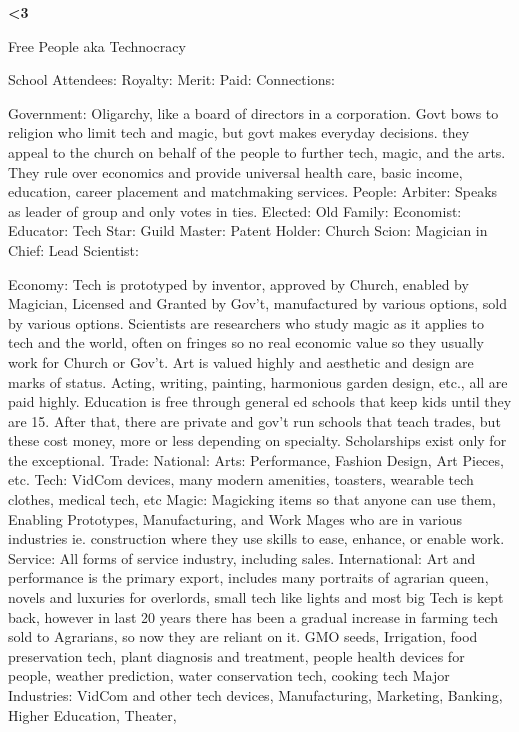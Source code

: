 \documentclass[blue]{GL2020}
\begin{document}
\name{\bTest{}}
\bf{<3}

Free People aka Technocracy

School Attendees:
	Royalty:
	Merit:
	Paid:
	Connections:

Government:  Oligarchy, like a board of directors in a corporation.  Govt bows to religion who limit tech and magic, but govt makes everyday decisions.  they appeal to the church on behalf of the people to further tech, magic, and the arts.  They rule over economics and provide universal health care, basic income, education, career placement and matchmaking services.
	People:		Arbiter:	Speaks as leader of group and only votes in ties.
						Elected:	
						Old Family:
						Economist:
						Educator:
						Tech Star:
						Guild Master:
						Patent Holder:
						Church Scion:
						Magician in Chief:
						Lead Scientist:
	
Economy:		Tech is prototyped by inventor, approved by Church, enabled by Magician, Licensed and Granted 
						by Gov't, manufactured by various options, sold by various options.  Scientists are researchers 
						who study magic as it applies to tech and the world, often on fringes so no real economic value 
						so they usually work for Church or Gov't.
						Art is valued highly and aesthetic and design are marks of status.  Acting, writing, painting,
						harmonious garden design, etc., all are paid highly.
						Education is free through general ed schools that keep kids until they are 15.  After that, there
						are private and gov't run schools that teach trades, but these cost money, more or less depending 
						on specialty.  Scholarships exist only for the exceptional.
	Trade:		National:		Arts:		Performance, Fashion Design, Art Pieces, etc.
												Tech:		VidCom devices, many modern amenities, toasters, wearable tech clothes, 
												medical tech, etc
												Magic:		Magicking items so that anyone can use them, Enabling Prototypes,
												Manufacturing, and Work Mages who are in various industries ie. construction 
												where they use skills to ease, enhance, or enable work.
												Service:		All forms of service industry, including sales.
						International:		Art and performance is the primary export, includes many portraits of agrarian queen, novels and luxuries for overlords, small tech like lights and most big Tech is kept back, however in last 20 years there has been a gradual increase in farming tech sold to Agrarians, so now they are reliant on it.  GMO seeds, Irrigation, food preservation tech, plant diagnosis and treatment, people health devices for people, weather prediction, water conservation tech, cooking tech
	Major Industries:  VidCom and other tech devices, Manufacturing, Marketing, Banking, Higher Education, Theater, 
	
\end{document}
